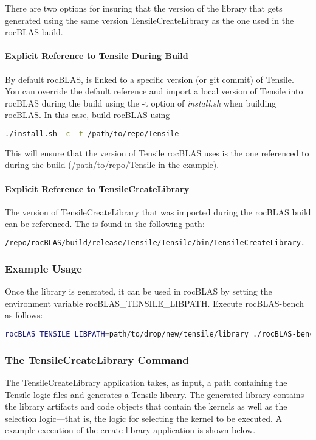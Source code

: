 \documentclass[]{article}
\begin{document}
There are two options for insuring that the version of the library that gets generated using the same version TensileCreateLibrary as the one used in the rocBLAS build.

\paragraph{Explicit Reference to Tensile During Build}
By default rocBLAS, is linked to a specific version (or git commit) of Tensile. You can override the default reference and import a local version of Tensile into rocBLAS during the build using the -t option of \emph{install.sh} when building rocBLAS. In this case, build rocBLAS using

\begin{lstlisting}[language=bash]
./install.sh -c -t /path/to/repo/Tensile
\end{lstlisting}

\noindent
This will ensure that the version of Tensile rocBLAS uses is the one referenced to during the build (/path/to/repo/Tensile in the example).

\paragraph{Explicit Reference to TensileCreateLibrary}

The version of TensileCreateLibrary that was imported during the rocBLAS build can be referenced. The is found in the following path:

\begin{lstlisting}[language=bash]
/repo/rocBLAS/build/release/Tensile/Tensile/bin/TensileCreateLibrary.
\end{lstlisting}

\subsubsection{Example Usage}

Once the library is generated, it can be used in rocBLAS by setting the environment variable rocBLAS\_TENSILE\_LIBPATH. Execute rocBLAS-bench as follows:

\begin{lstlisting}[language=bash]
rocBLAS_TENSILE_LIBPATH=path/to/drop/new/tensile/library ./rocBLAS-bench --yaml problem_sizes.yaml
\end{lstlisting}

\subsubsection{The TensileCreateLibrary Command}
The TensileCreateLibrary application takes, as input, a path containing the Tensile logic files and generates a Tensile library. The generated library contains the library artifacts and code objects that contain the kernels as well as the selection logic---that is, the logic for selecting the kernel to be executed. A example execution of the create library application is shown below.
\end{document}
